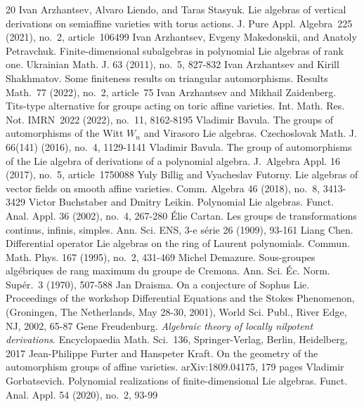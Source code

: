 \documentclass[a4paper, 12pt,oneside,reqno]{amsart}
\numberwithin{equation}{section}
\theoremstyle{definition}
\begin{document}
{\begin{thebibliography}{20}
%
Ivan Arzhantsev, Alvaro Liendo, and Taras Stasyuk. Lie algebras of vertical derivations on semiaffine varieties with torus actions. J. Pure Appl. Algebra~225 (2021), no.~2, article~106499
%
Ivan Arzhantsev, Evgeny Makedonskii, and Anatoly Petravchuk. Finite-dimensional subalgebras in polynomial Lie algebras of rank one. Ukrainian Math. J. 63 (2011), no.~5, 827-832 
%
Ivan Arzhantsev and Kirill Shakhmatov. Some finiteness results on triangular automorphisms. Results Math.~77 (2022), no.~2, article~75
%
Ivan Arzhantsev and Mikhail Zaidenberg. Tits-type alternative for groups acting on toric affine varieties. Int. Math. Res. Not. IMRN~2022 (2022), no.~11, 8162-8195
%
Vladimir Bavula. The groups of automorphisms of the Witt $W_n$ and Virasoro Lie algebras. Czechoslovak Math. J. 66(141) (2016), no.~4, 1129-1141
%
Vladimir Bavula. The group of automorphisms of the Lie algebra of derivations of a polynomial algebra. J.~Algebra Appl. 16 (2017), no.~5, article~1750088
%
Yuly Billig and Vyacheslav Futorny. Lie algebras of vector fields on smooth affine varieties. Comm. Algebra 46 (2018), no.~8, 3413-3429
%
Victor Buchstaber and Dmitry Leikin. Polynomial Lie algebras. Funct. Anal. Appl. 36 (2002), no.~4, 267-280
%
\'Elie Cartan. Les groups de transformations continus, infinis, simples. Ann. Sci. ENS, 3-e s\'erie 26 (1909), 93-161
%
Liang Chen. Differential operator Lie algebras on the ring of Laurent polynomials. Commun. Math. Phys. 167 (1995), no.~2, 431-469
%
Michel Demazure. Sous-groupes alg\'ebriques de rang maximum du groupe de Cremona. Ann. Sci. \'Ec. Norm. Sup\'er.~3 (1970), 507-588
%
Jan Draisma. On a conjecture of Sophus Lie. Proceedings of the workshop Differential Equations and the Stokes Phenomenon, (Groningen, The Netherlands, May 28-30, 2001), World Sci. Publ., River Edge, NJ, 2002, 65-87
%
Gene Freudenburg. \emph{Algebraic theory of locally nilpotent derivations}. Encyclopaedia Math. Sci.~136, Springer-Verlag, Berlin, Heidelberg, 2017
%
Jean-Philippe Furter and Hanspeter Kraft. On the geometry of the automorphism groups of affine varieties. arXiv:1809.04175,  179 pages
%
Vladimir Gorbatsevich. Polynomial realizations of finite-dimensional Lie algebras. Funct. Anal. Appl. 54 (2020), no.~2, 93-99 

\end{thebibliography}}
\end{document}
